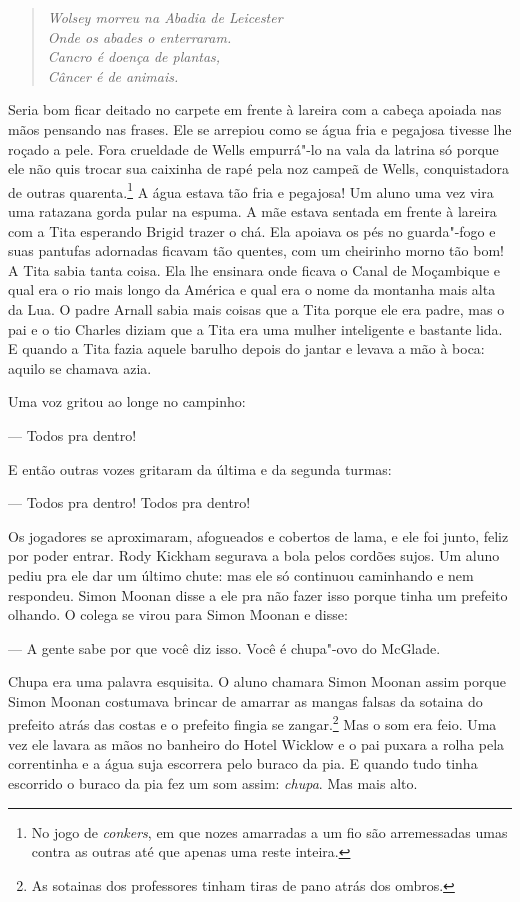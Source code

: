 \begin{verse}\itshape
Wolsey morreu na Abadia de Leicester\\
Onde os abades o enterraram.\\
Cancro é doença de plantas,\\
Câncer é de animais.
\end{verse}

Seria bom ficar deitado no carpete em frente à lareira com a cabeça
apoiada nas mãos pensando nas frases. Ele se arrepiou como se água fria
e pegajosa tivesse lhe roçado a pele. Fora crueldade de Wells empurrá"-lo
na vala da latrina só porque ele não quis trocar sua caixinha de rapé
pela noz campeã de Wells, conquistadora de outras quarenta.\footnote{ No
jogo de \textit{conkers}, em que nozes amarradas a um fio são
arremessadas umas contra as outras até que apenas uma reste inteira.}
A água estava tão fria e pegajosa! Um aluno uma vez vira uma ratazana
gorda pular na espuma. A mãe estava sentada em frente à lareira com a
Tita esperando Brigid trazer o chá. Ela apoiava os pés no guarda"-fogo e
suas pantufas adornadas ficavam tão quentes, com um cheirinho morno tão
bom! A Tita sabia tanta coisa. Ela lhe ensinara onde ficava o
Canal de Moçambique e qual era o rio mais longo da América e qual era o
nome da montanha mais alta da Lua. O padre Arnall sabia mais coisas que
a Tita porque ele era padre, mas o pai e o tio Charles diziam que a
Tita era uma mulher inteligente e bastante lida. E quando a Tita fazia
aquele barulho depois do jantar e levava a mão à boca: aquilo se
chamava azia.

Uma voz gritou ao longe no campinho:

 --- Todos pra dentro!

E então outras vozes gritaram da última e da segunda turmas:

 --- Todos pra dentro! Todos pra dentro!

Os jogadores se aproximaram, afogueados e cobertos de lama, e ele foi
junto, feliz por poder entrar. Rody Kickham segurava a bola pelos
cordões sujos. Um aluno pediu pra ele dar um último chute: mas ele só
continuou caminhando e nem respondeu. Simon Moonan disse a ele pra não
fazer isso porque tinha um prefeito olhando. O colega se virou para
Simon Moonan e disse:

 --- A gente sabe por que você diz isso. Você é chupa"-ovo do McGlade.

Chupa era uma palavra esquisita. O aluno chamara Simon Moonan assim
porque Simon Moonan costumava brincar de amarrar as mangas falsas da
sotaina do prefeito atrás das costas e o prefeito fingia se
zangar.\footnote{ As sotainas dos professores tinham tiras de pano atrás
dos ombros.} Mas o som era feio. Uma vez ele lavara as mãos no
banheiro do Hotel Wicklow e o pai puxara a rolha pela correntinha
e a água suja escorrera pelo buraco da pia. E quando tudo tinha
escorrido o buraco da pia fez um som assim: \textit{chupa}. Mas mais
alto.


